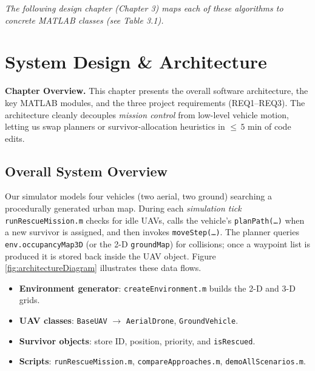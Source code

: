 \documentclass[12pt,a4paper]{report}
\begin{document}
\vspace{0.5em}
\noindent
\emph{The following design chapter (Chapter 3) maps each of these algorithms to concrete 
MATLAB classes (see Table 3.1).}
\chapter{System Design \& Architecture}
\label{cha:system_design}

\textbf{Chapter Overview.}
This chapter presents the overall software architecture, the key MATLAB modules, and the
three project requirements (REQ1–REQ3).  
The architecture cleanly decouples \emph{mission control} from low-level vehicle motion,
letting us swap planners or survivor-allocation heuristics in
\(\le\!\,5\text{ min}\) of code edits.

\section{Overall System Overview}
\label{sec:sys_overview}

Our simulator models four vehicles (two aerial, two ground) searching a procedurally
generated urban map. During each \emph{simulation tick} \texttt{runRescueMission.m}
checks for idle UAVs, calls the vehicle’s \texttt{planPath(\dots)} when a new survivor is
assigned, and then invokes \texttt{moveStep(\dots)}.  
The planner queries \texttt{env.occupancyMap3D} (or the 2-D \texttt{groundMap}) for
collisions; once a waypoint list is produced it is stored back inside the UAV object.
Figure \ref{fig:architectureDiagram} illustrates these data flows.

\begin{itemize}[leftmargin=1.6em]
  \item \textbf{Environment generator}: \texttt{createEnvironment.m} builds the 2-D and 3-D grids.
  \item \textbf{UAV classes}: \texttt{BaseUAV} \(\rightarrow\) \texttt{AerialDrone}, \texttt{GroundVehicle}.
  \item \textbf{Survivor objects}: store ID, position, priority, and \texttt{isRescued}.
  \item \textbf{Scripts}: \texttt{runRescueMission.m}, \texttt{compareApproaches.m}, \texttt{demoAllScenarios.m}.
\end{itemize}
\end{document}
